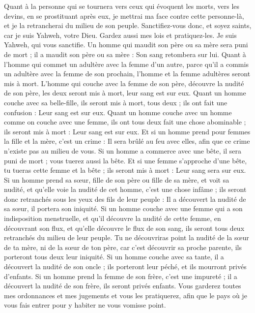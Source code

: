 \begin{multicols}{2}
Quant à la personne qui se tournera vers ceux qui évoquent les morts, vers les devins, en se prostituant après eux, je mettrai ma face contre cette personne-là, et je la retrancherai du milieu de son peuple.
Sanctifiez-vous donc, et soyez saints, car je suis Yahweh, votre Dieu.
Gardez aussi mes lois et pratiquez-les. Je suis Yahweh, qui vous sanctifie.
Un homme qui maudit son père ou sa mère sera puni de mort ; il a maudit son père ou sa mère : Son sang retombera sur lui.
Quant à l'homme qui commet un adultère avec la femme d'un autre, parce qu'il a commis un adultère avec la femme de son prochain, l'homme et la femme adultères seront mis à mort.
L'homme qui couche avec la femme de son père, découvre la nudité de son père, les deux seront mis à mort, leur sang est sur eux.
Quant un homme couche avec sa belle-fille, ils seront mis à mort, tous deux ; ils ont fait une confusion : Leur sang est sur eux.
Quant un homme couche avec un homme comme on couche avec une femme, ils ont tous deux fait une chose abominable ; ils seront mis à mort : Leur sang est sur eux.
Et si un homme prend pour femmes la fille et la mère, c'est un crime : Il sera brûlé au feu avec elles, afin que ce crime n'existe pas au milieu de vous.
Si un homme a commerce avec une bête, il sera puni de mort ; vous tuerez aussi la bête.
Et si une femme s'approche d'une bête, tu tueras cette femme et la bête ; ils seront mis à mort : Leur sang sera sur eux.
Si un homme prend sa sœur, fille de son père ou fille de sa mère, et voit sa nudité, et qu'elle voie la nudité de cet homme, c'est une chose infâme ; ils seront donc retranchés sous les yeux des fils de leur peuple : Il a découvert la nudité de sa sœur, il portera son iniquité.
Si un homme couche avec une femme qui a son indisposition menstruelle, et qu'il découvre la nudité de cette femme, en découvrant son flux, et qu'elle découvre le flux de son sang, ils seront tous deux retranchés du milieu de leur peuple.
Tu ne découvriras point la nudité de la sœur de ta mère, ni de la sœur de ton père, car c'est découvrir sa proche parente, ils porteront tous deux leur iniquité.
Si un homme couche avec sa tante, il a découvert la nudité de son oncle ; ils porteront leur péché, et ils mourront privés d'enfants.
Si un homme prend la femme de son frère, c'est une impureté ; il a découvert la nudité de son frère, ils seront privés enfants.
Vous garderez toutes mes ordonnances et mes jugements et vous les pratiquerez, afin que le pays où je vous fais entrer pour y habiter ne vous vomisse point.

\end{multicols}
